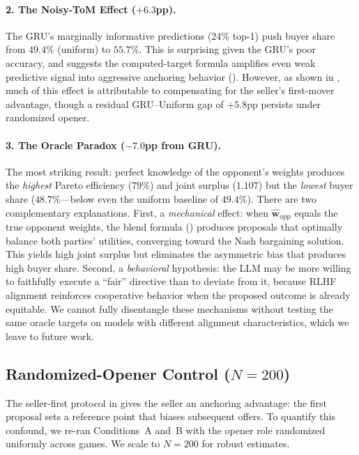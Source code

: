 \documentclass[11pt,a4paper]{article}
\begin{document}
\paragraph{2. The Noisy-ToM Effect ($+6.3$pp).}
The GRU's marginally informative predictions (24\% top-1) push buyer share from $49.4\%$ (uniform) to $55.7\%$. This is surprising given the GRU's poor accuracy, and suggests the computed-target formula amplifies even weak predictive signal into aggressive anchoring behavior (). However, as shown in , much of this effect is attributable to compensating for the seller's first-mover advantage, though a residual GRU--Uniform gap of $+5.8$pp persists under randomized opener.

\paragraph{3. The Oracle Paradox ($-7.0$pp from GRU).}
The most striking result: perfect knowledge of the opponent's weights produces the \emph{highest} Pareto efficiency ($79\%$) and joint surplus ($1.107$) but the \emph{lowest} buyer share ($48.7\%$---below even the uniform baseline of $49.4\%$). There are two complementary explanations. First, a \emph{mechanical} effect: when $\hat{\mathbf{w}}_\text{opp}$ equals the true opponent weights, the blend formula () produces proposals that optimally balance both parties' utilities, converging toward the Nash bargaining solution. This yields high joint surplus but eliminates the asymmetric bias that produces high buyer share. Second, a \emph{behavioral} hypothesis: the LLM may be more willing to faithfully execute a ``fair'' directive than to deviate from it, because RLHF alignment reinforces cooperative behavior when the proposed outcome is already equitable. We cannot fully disentangle these mechanisms without testing the same oracle targets on models with different alignment characteristics, which we leave to future work.

\subsection{\texorpdfstring{Randomized-Opener Control ($N = 200$)}{Randomized-Opener Control (N = 200)}}
\label{sec:opener}

The seller-first protocol in  gives the seller an anchoring advantage: the first proposal sets a reference point that biases subsequent offers. To quantify this confound, we re-ran Conditions~A and~B with the opener role randomized uniformly across games. We scale to $N = 200$ for robust estimates.
\end{document}
